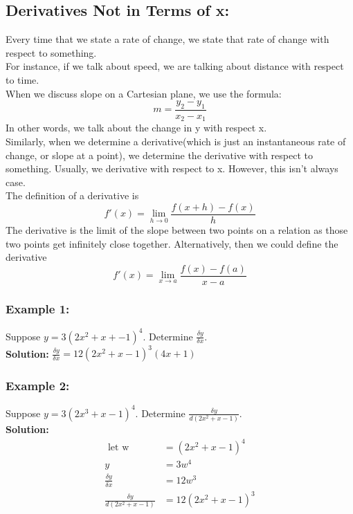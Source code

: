 \documentclass{article}
\begin{document}
\subsection{Derivatives Not in Terms of x:}
Every time that we state a rate of change, we state that rate of change with respect to something.\\
For instance, if we talk about speed, we are talking about distance with respect to time.\\
When we discuss slope on a Cartesian plane, we use the formula:
$$m=\frac{y_2-y_1}{x_2-x_1}$$
In other words, we talk about the change in y with respect x.\\
Similarly, when we determine a derivative(which is just an instantaneous rate of change, or slope at a point), we determine the derivative with respect to something. Usually, we derivative with respect to x. However, this isn't always case.\\

The definition of a derivative is 
$$f'(x)=\lim_{h \to 0}\frac{f(x+h)-f(x)}{h}$$
The derivative is the limit of the slope between two points on a relation as those two points get infinitely close together. Alternatively, then we could define the derivative $$f'(x)= \lim_{x \to a }\frac{f(x)-f(a)}{x-a}$$

\subsubsection*{Example 1:}
Suppose $y=3(2x^2+x+-1)^4$. Determine $\frac{\delta y}{\delta x}$.\\
\textbf{Solution:}
$\frac{\delta y}{\delta x}=12(2x^2+x-1)^3(4x+1)$
\subsubsection*{Example 2:}
Suppose $y=3(2x^3+x-1)^4$. Determine $\frac{\delta y}{d(2x^2+x-1)}$.\\
\textbf{Solution:}
\begin{align*}
    \text{ let w } &= (2x^2+x-1)^4\\
    y&=3w^4\\
    \frac{\delta y}{\delta x}&=12w^3\\
    \frac{\delta y}{d(2x^2+x-1)}&=12(2x^2+x-1)^3
\end{align*}
\end{document}
